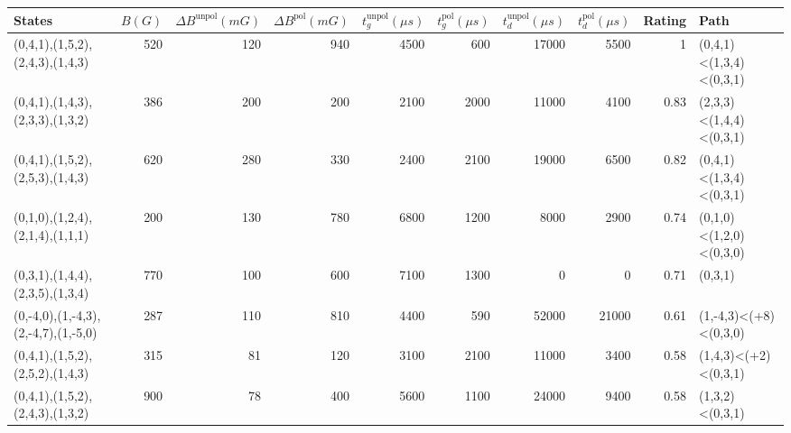 \begin{tabular}{lrrrrrrrrl}
\hline
 {States}                            &   {$B(G)$} &   {$\Delta B^{\text{unpol}}(mG)$} &   {$\Delta B^{\text{pol}}(mG)$} &   {$t^{\text{unpol}}_{g}(\mu s)$} &   {$t^{\text{pol}}_{g}(\mu s)$} &   {$t^{\text{unpol}}_{d}(\mu s)$} &   {$t^{\text{pol}}_{d}(\mu s)$} &   {Rating} & {Path}                  \\
\hline
 (0,4,1),(1,5,2),(2,4,3),(1,4,3)     &        520 &                               120 &                             940 &                              4500 &                             600 &                             17000 &                            5500 &       1    & (0,4,1)<(1,3,4)<(0,3,1) \\
 (0,4,1),(1,4,3),(2,3,3),(1,3,2)     &        386 &                               200 &                             200 &                              2100 &                            2000 &                             11000 &                            4100 &       0.83 & (2,3,3)<(1,4,4)<(0,3,1) \\
 (0,4,1),(1,5,2),(2,5,3),(1,4,3)     &        620 &                               280 &                             330 &                              2400 &                            2100 &                             19000 &                            6500 &       0.82 & (0,4,1)<(1,3,4)<(0,3,1) \\
 (0,1,0),(1,2,4),(2,1,4),(1,1,1)     &        200 &                               130 &                             780 &                              6800 &                            1200 &                              8000 &                            2900 &       0.74 & (0,1,0)<(1,2,0)<(0,3,0) \\
 (0,3,1),(1,4,4),(2,3,5),(1,3,4)     &        770 &                               100 &                             600 &                              7100 &                            1300 &                                 0 &                               0 &       0.71 & (0,3,1)                 \\
 (0,-4,0),(1,-4,3),(2,-4,7),(1,-5,0) &        287 &                               110 &                             810 &                              4400 &                             590 &                             52000 &                           21000 &       0.61 & (1,-4,3)<(+8)<(0,3,0)   \\
 (0,4,1),(1,5,2),(2,5,2),(1,4,3)     &        315 &                                81 &                             120 &                              3100 &                            2100 &                             11000 &                            3400 &       0.58 & (1,4,3)<(+2)<(0,3,1)    \\
 (0,4,1),(1,5,2),(2,4,3),(1,3,2)     &        900 &                                78 &                             400 &                              5600 &                            1100 &                             24000 &                            9400 &       0.58 & (1,3,2)<(0,3,1)         \\
\hline
\end{tabular}